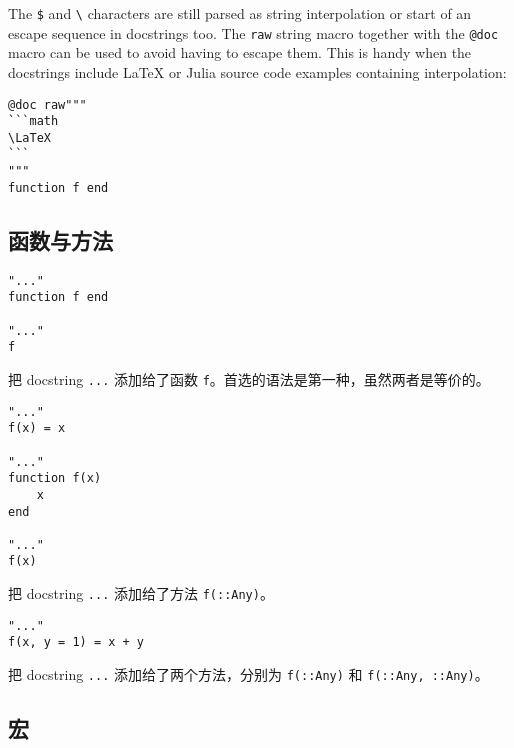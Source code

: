 The \texttt{\$} and \texttt{{\textbackslash}} characters are still parsed as string interpolation or start of an escape sequence in docstrings too. The \texttt{raw{\textquotedbl}{\textquotedbl}} string macro together with the \texttt{@doc} macro can be used to avoid having to escape them. This is handy when the docstrings include LaTeX or Julia source code examples containing interpolation:




\begin{verbatim}
@doc raw"""
```math
\LaTeX
```
"""
function f end
\end{verbatim}



\hypertarget{198065463690830309}{}


\subsection{函数与方法}




\begin{verbatim}
"..."
function f end

"..."
f
\end{verbatim}



把 docstring \texttt{{\textquotedbl}...{\textquotedbl}} 添加给了函数 \texttt{f}。首选的语法是第一种，虽然两者是等价的。




\begin{verbatim}
"..."
f(x) = x

"..."
function f(x)
    x
end

"..."
f(x)
\end{verbatim}



把 docstring \texttt{{\textquotedbl}...{\textquotedbl}} 添加给了方法 \texttt{f(::Any)}。




\begin{verbatim}
"..."
f(x, y = 1) = x + y
\end{verbatim}



把 docstring \texttt{{\textquotedbl}...{\textquotedbl}} 添加给了两个方法，分别为 \texttt{f(::Any)} 和 \texttt{f(::Any, ::Any)}。



\hypertarget{958098821246331521}{}


\subsection{宏}





